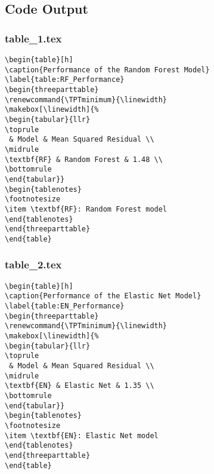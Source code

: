 \documentclass[11pt]{article}
\begin{document}
\subsection{Code Output}

\subsubsection*{table\_1.tex}

\begin{Verbatim}[tabsize=4]
\begin{table}[h]
\caption{Performance of the Random Forest Model}
\label{table:RF_Performance}
\begin{threeparttable}
\renewcommand{\TPTminimum}{\linewidth}
\makebox[\linewidth]{%
\begin{tabular}{llr}
\toprule
 & Model & Mean Squared Residual \\
\midrule
\textbf{RF} & Random Forest & 1.48 \\
\bottomrule
\end{tabular}}
\begin{tablenotes}
\footnotesize
\item \textbf{RF}: Random Forest model
\end{tablenotes}
\end{threeparttable}
\end{table}

\end{Verbatim}

\subsubsection*{table\_2.tex}

\begin{Verbatim}[tabsize=4]
\begin{table}[h]
\caption{Performance of the Elastic Net Model}
\label{table:EN_Performance}
\begin{threeparttable}
\renewcommand{\TPTminimum}{\linewidth}
\makebox[\linewidth]{%
\begin{tabular}{llr}
\toprule
 & Model & Mean Squared Residual \\
\midrule
\textbf{EN} & Elastic Net & 1.35 \\
\bottomrule
\end{tabular}}
\begin{tablenotes}
\footnotesize
\item \textbf{EN}: Elastic Net model
\end{tablenotes}
\end{threeparttable}
\end{table}

\end{Verbatim}
\end{document}
